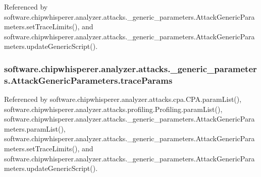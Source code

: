 Referenced by software.\+chipwhisperer.\+analyzer.\+attacks.\+\_\+generic\+\_\+parameters.\+Attack\+Generic\+Parameters.\+set\+Trace\+Limits(), and software.\+chipwhisperer.\+analyzer.\+attacks.\+\_\+generic\+\_\+parameters.\+Attack\+Generic\+Parameters.\+update\+Generic\+Script().

\hypertarget{classsoftware_1_1chipwhisperer_1_1analyzer_1_1attacks_1_1__generic__parameters_1_1AttackGenericParameters_a450c85a3cf7f66e6dc8baf84275013ef}{}
\subsubsection[{trace\+Params}]{\setlength{\rightskip}{0pt plus 5cm}software.\+chipwhisperer.\+analyzer.\+attacks.\+\_\+generic\+\_\+parameters.\+Attack\+Generic\+Parameters.\+trace\+Params}\label{classsoftware_1_1chipwhisperer_1_1analyzer_1_1attacks_1_1__generic__parameters_1_1AttackGenericParameters_a450c85a3cf7f66e6dc8baf84275013ef}


Referenced by software.\+chipwhisperer.\+analyzer.\+attacks.\+cpa.\+C\+P\+A.\+param\+List(), software.\+chipwhisperer.\+analyzer.\+attacks.\+profiling.\+Profiling.\+param\+List(), software.\+chipwhisperer.\+analyzer.\+attacks.\+\_\+generic\+\_\+parameters.\+Attack\+Generic\+Parameters.\+param\+List(), software.\+chipwhisperer.\+analyzer.\+attacks.\+\_\+generic\+\_\+parameters.\+Attack\+Generic\+Parameters.\+set\+Trace\+Limits(), and software.\+chipwhisperer.\+analyzer.\+attacks.\+\_\+generic\+\_\+parameters.\+Attack\+Generic\+Parameters.\+update\+Generic\+Script().

\hypertarget{classsoftware_1_1chipwhisperer_1_1analyzer_1_1attacks_1_1__generic__parameters_1_1AttackGenericParameters_aea7b21b5cfca1b53fc85f20c1138f917}{}
